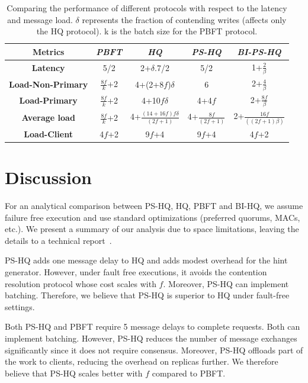 \documentclass[twocolumn,10pt]{article}
\newcommand{\stitle}[1]{\vspace{2pt}{\bf #1:}}
\begin{document}
\begin{table}
\centering
\begin{tabular}{|c|c|c|c|c|}
\hline
\small{Metrics}& \textit{\small{PBFT}} & \textit{\small{HQ}} & \textit{\small{PS-HQ}} & \textit{\small{BI-PS-HQ}}\\
\hline
\hline
\textbf{\small{Latency}} & 5/2 & 2+$\delta$.7/2 & 5/2 &  1+$\frac{2}{\beta}$ \\
\hline
\textbf{\small{Load-Non-Primary}} & $\frac{8f}{k}$+2 & 4+(2+8$f$)$\delta$ & 6 & 2+$\frac{4}{\beta}$ \\
\hline
\textbf{\small{Load-Primary}} & $\frac{8f}{k}$+2 & 4+10$f\delta$ & 4+4$f$ & 2+$\frac{8f}{\beta}$\\
\hline
\textbf{\small{Average load}} & $\frac{8f}{k}$+2 & 4+$\frac{(14+16f)f\delta}{(2f+1)}$ & 4+$\frac{8f}{(2f+1)}$ &  2+$\frac{16f}{((2f+1)\beta)}$ \\
\hline
\textbf{\small{Load-Client}}& 4$f$+2& 9$f$+4& 9$f$+4 & 4$f$+2\\
\hline
\end{tabular}
\caption{Comparing the performance of different protocols with respect to the latency and message load.
 $\delta$ represents the fraction of contending writes (affects only the HQ protocol). k is the batch size for the PBFT protocol. }
\label{tab:overhead_est}
\end{table}

\fi

\section{Discussion}
\label{sec:analysis}
For an analytical comparison between PS-HQ, HQ, PBFT and BI-HQ, we assume failure free execution 
and use standard optimizations (preferred quorums, MACs, etc.). We present a summary of our
analysis due to space limitations, leaving the details to a technical report~\cite{hq++:website}. 

\stitle{1. PS-HQ vs HQ} PS-HQ adds one message delay to HQ and adds modest overhead for the
hint generator. However, under fault free executions, it avoids the contention 
resolution protocol whose
cost scales with $f$. Moreover, PS-HQ can implement batching. 
Therefore, we believe that PS-HQ is superior to HQ under fault-free settings.

\stitle{2. PS-HQ vs PBFT} Both PS-HQ and PBFT require 5 message delays to complete requests.
Both can implement batching. However, PS-HQ reduces the number of message exchanges significantly
since it does not require consensus. Moreover, PS-HQ offloads part of the work to clients, reducing
the overhead on replicas further. We therefore believe that PS-HQ scales better with $f$ compared to
PBFT.
\end{document}
